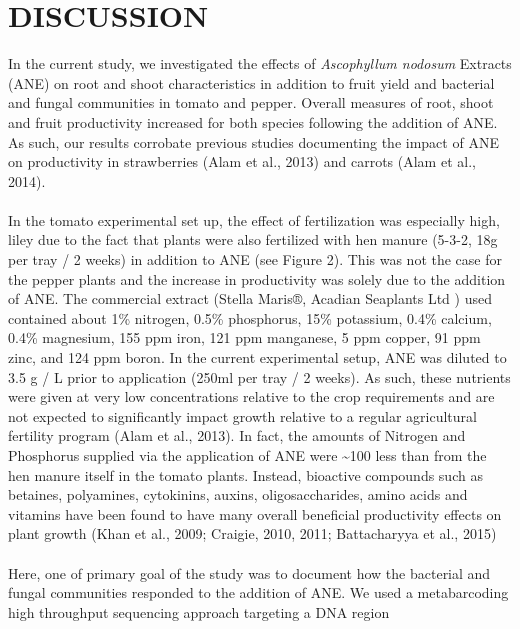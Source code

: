 \documentclass[11pt,]{article}
\begin{document}
\newpage  

\section{DISCUSSION}\label{discussion}

In the current study, we investigated the effects of \emph{Ascophyllum
nodosum} Extracts (ANE) on root and shoot characteristics in addition to
fruit yield and bacterial and fungal communities in tomato and pepper.
Overall measures of root, shoot and fruit productivity increased for
both species following the addition of ANE. As such, our results
corrobate previous studies documenting the impact of ANE on productivity
in strawberries (Alam et al., 2013) and carrots (Alam et al., 2014).\\
\hspace*{0.333em}\\
In the tomato experimental set up, the effect of fertilization was
especially high, liley due to the fact that plants were also fertilized
with hen manure (5-3-2, 18g per tray / 2 weeks) in addition to ANE (see
Figure 2). This was not the case for the pepper plants and the increase
in productivity was solely due to the addition of ANE. The commercial
extract (Stella Maris®, Acadian Seaplants Ltd ) used contained about 1\%
nitrogen, 0.5\% phosphorus, 15\% potassium, 0.4\% calcium, 0.4\%
magnesium, 155 ppm iron, 121 ppm manganese, 5 ppm copper, 91 ppm zinc,
and 124 ppm boron. In the current experimental setup, ANE was diluted to
3.5 g / L prior to application (250ml per tray / 2 weeks). As such,
these nutrients were given at very low concentrations relative to the
crop requirements and are not expected to significantly impact growth
relative to a regular agricultural fertility program (Alam et al.,
2013). In fact, the amounts of Nitrogen and Phosphorus supplied via the
application of ANE were \textasciitilde{}100 less than from the hen
manure itself in the tomato plants. Instead, bioactive compounds such as
betaines, polyamines, cytokinins, auxins, oligosaccharides, amino acids
and vitamins have been found to have many overall beneficial
productivity effects on plant growth (Khan et al., 2009; Craigie, 2010,
2011; Battacharyya et al., 2015)\\
\hspace*{0.333em}\\
Here, one of primary goal of the study was to document how the bacterial
and fungal communities responded to the addition of ANE. We used a
metabarcoding high throughput sequencing approach targeting a DNA region
\end{document}
